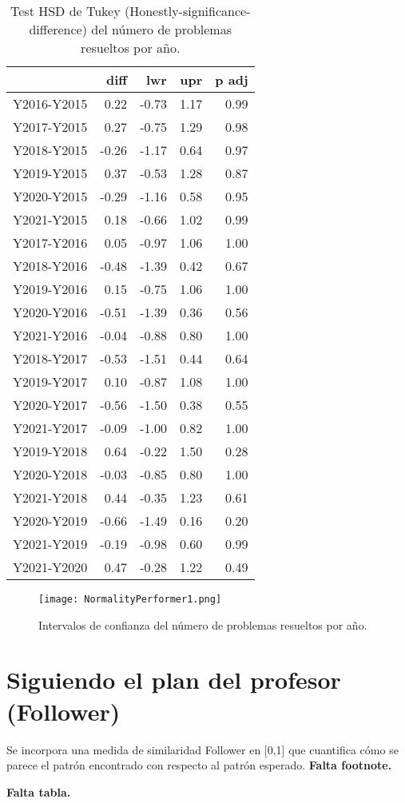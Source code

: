 \begin{table}[ht]
\centering
\caption{Test HSD de Tukey (Honestly-significance-difference) del número de problemas resueltos por año.}
\label{tab:Tukeyperformer}
\begin{tabular}{rrrrr}
  \hline
 & diff & lwr & upr & p adj \\ 
  \hline
Y2016-Y2015 & 0.22 & -0.73 & 1.17 & 0.99 \\ 
  Y2017-Y2015 & 0.27 & -0.75 & 1.29 & 0.98 \\ 
  Y2018-Y2015 & -0.26 & -1.17 & 0.64 & 0.97 \\ 
  Y2019-Y2015 & 0.37 & -0.53 & 1.28 & 0.87 \\ 
  Y2020-Y2015 & -0.29 & -1.16 & 0.58 & 0.95 \\ 
  Y2021-Y2015 & 0.18 & -0.66 & 1.02 & 0.99 \\ 
  Y2017-Y2016 & 0.05 & -0.97 & 1.06 & 1.00 \\ 
  Y2018-Y2016 & -0.48 & -1.39 & 0.42 & 0.67 \\ 
  Y2019-Y2016 & 0.15 & -0.75 & 1.06 & 1.00 \\ 
  Y2020-Y2016 & -0.51 & -1.39 & 0.36 & 0.56 \\ 
  Y2021-Y2016 & -0.04 & -0.88 & 0.80 & 1.00 \\ 
  Y2018-Y2017 & -0.53 & -1.51 & 0.44 & 0.64 \\ 
  Y2019-Y2017 & 0.10 & -0.87 & 1.08 & 1.00 \\ 
  Y2020-Y2017 & -0.56 & -1.50 & 0.38 & 0.55 \\ 
  Y2021-Y2017 & -0.09 & -1.00 & 0.82 & 1.00 \\ 
  Y2019-Y2018 & 0.64 & -0.22 & 1.50 & 0.28 \\ 
  Y2020-Y2018 & -0.03 & -0.85 & 0.80 & 1.00 \\ 
  Y2021-Y2018 & 0.44 & -0.35 & 1.23 & 0.61 \\ 
  Y2020-Y2019 & -0.66 & -1.49 & 0.16 & 0.20 \\ 
  Y2021-Y2019 & -0.19 & -0.98 & 0.60 & 0.99 \\ 
  Y2021-Y2020 & 0.47 & -0.28 & 1.22 & 0.49 \\ 
   \hline
\end{tabular}
\end{table}

\begin{figure}[H]
    \centering
    \texttt{[image: NormalityPerformer1.png]}
    \caption{Intervalos de confianza del número de problemas resueltos por año.}
    \label{fig:confidenceperformer}
\end{figure}

\section{Siguiendo el plan del profesor (Follower)}

Se incorpora una medida de similaridad Follower en [0,1] que cuantifica cómo se parece el patrón encontrado con respecto al patrón esperado. \textbf{Falta footnote.}

\textbf{Falta tabla.}